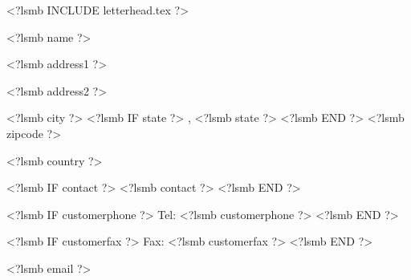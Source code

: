 \documentclass{scrartcl}
\begin{document}
\pagestyle{myheadings}
\thispagestyle{empty}

\fontsize{10pt}{12pt}\selectfont

\newsavebox{\ftr}

<?lsmb INCLUDE letterhead.tex ?>


%
%  
%
%
%


\vspace*{0.5cm}

\parbox[t]{.5\textwidth}{

<?lsmb name ?>

<?lsmb address1 ?>

<?lsmb address2 ?>

<?lsmb city ?>
<?lsmb IF state ?>
\hspace{-0.1cm}, <?lsmb state ?>
<?lsmb END ?>
<?lsmb zipcode ?>

<?lsmb country ?>

\vspace{0.3cm}

<?lsmb IF contact ?>
<?lsmb contact ?>
\vspace{0.2cm}
<?lsmb END ?>

<?lsmb IF customerphone ?>
Tel: <?lsmb customerphone ?>
<?lsmb END ?>

<?lsmb IF customerfax ?>
Fax: <?lsmb customerfax ?>
<?lsmb END ?>

<?lsmb email ?>
}

\vspace{1cm}
\end{document}
